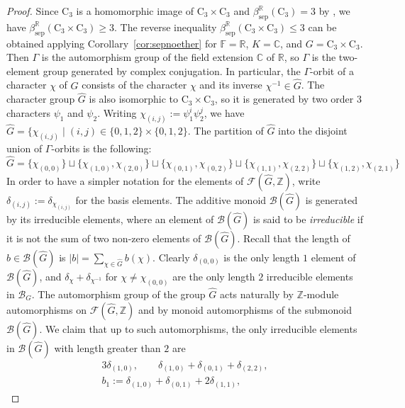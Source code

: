 \documentclass[12pt, oneside]{amsart}
\def\field{K}
\def\ZZ{\mathbb{Z}}
\def\RR{\mathbb{R}}
\def\CC{\mathbb{C}}
\def\FF{\mathbb{F}}
\def\sepbeta{\beta_{\mathrm{sep}}}
\begin{document}
\begin{proof} 
Since $\mathrm{C}_3$ is a homomorphic image of $\mathrm{C}_3\times\mathrm{C}_3$ and $\sepbeta^\RR(\mathrm{C}_3)=3$ 
by  \cite[Proposition 3.13]{blumsmith-garcia-hidalgo-rodriguez}, we have $\sepbeta^\RR(\mathrm{C}_3\times\mathrm{C}_3)\ge 3$. 
The reverse inequality  $\sepbeta^\RR(\mathrm{C}_3\times\mathrm{C}_3)\le 3$ can be obtained applying 
Corollary~\ref{cor:sepnoether} for $\FF=\RR$, $\field=\CC$, and $G=\mathrm{C}_3\times\mathrm{C}_3$. 
Then $\Gamma$ is the automorphism group of the field extension $\CC$ of $\RR$, 
so $\Gamma$ is the two-element group generated by complex conjugation. 
In particular, the $\Gamma$-orbit of a character $\chi$ of $G$ consists of the character $\chi$ and 
its inverse $\chi^{-1}\in \widehat G$. The character group $\widehat G$ is also isomorphic to 
$\mathrm{C}_3\times\mathrm{C}_3$, so it is generated by two order $3$ characters $\psi_1$ 
and $\psi_2$. Writing $\chi_{(i,j)}:=\psi_1^i\psi_2^j$, we have 
$\widehat G=\{\chi_{(i,j)}\mid (i,j)\in \{0,1,2\}\times \{0,1,2\}$. 
The partition of $\widehat G$ into the disjoint union of $\Gamma$-orbits is the following: 
\[\widehat G=\{\chi_{(0,0)}\}\sqcup \{\chi_{(1,0)},\chi_{(2,0)}\}\sqcup
\{\chi_{(0,1)},\chi_{(0,2)}\}\sqcup\{\chi_{(1,1)},\chi_{(2,2)}\}\sqcup 
\{\chi_{(1,2)},\chi_{(2,1)}\}\]
In order to have a simpler notation for the elements of $\mathcal{F}(\widehat G,\ZZ)$, write 
$\delta_{(i,j)}:=\delta_{\chi_{(i,j)}}$ for the basis elements. 
The additive monoid $\mathcal{B}(\widehat G)$ is generated by its irreducible elements, 
where an element of  $\mathcal{B}(\widehat G)$ is said to be \emph{irreducible} 
if it is not the sum of two non-zero elements of $\mathcal{B}(\widehat G)$. 
Recall that the length of  $b\in \mathcal{B}(\widehat G)$ is $|b|=\sum_{\chi\in \widehat G}b(\chi)$. 
Clearly $\delta_{(0,0)}$ is the only length $1$ element of $\mathcal{B}(\widehat G)$, 
and $\delta_\chi+\delta_{\chi^{-1}}$ for $\chi\neq \chi_{(0,0)}$ are the only length $2$ irreducible elements  
in $\mathcal{B}_G$. The automorphism group of the group $\widehat G$ acts naturally by 
$\ZZ$-module automorphisms on $\mathcal{F}(\widehat G, \ZZ)$ and by monoid automorphisms of the 
submonoid $\mathcal{B}(\widehat G)$. We claim that up to such automorphisms, the only irreducible elements 
in $\mathcal{B}(\widehat G)$ with length greater than $2$ are 
\begin{align*} 3\delta_{(1,0)},\qquad 
\delta_{(1,0)}+\delta_{(0,1)}+\delta_{(2,2)}, \\
b_1:=\delta_{(1,0)}+\delta_{(0,1)}+2\delta_{(1,1)}, \qquad 

\end{align*}
\end{proof}
\end{document}

